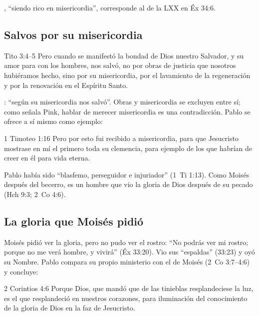 , ``siendo rico en misericordia'', corresponde al  de la LXX en Éx 34:6.


\subsection{Salvos por su misericordia}
\begin{verso}{Tito 3:4–5}
Pero cuando se manifestó la bondad de Dios nuestro Salvador, y su amor para con los hombres, nos salvó, no por obras de justicia que nosotros hubiéramos hecho, sino por su misericordia, por el lavamiento de la regeneración y por la renovación en el Espíritu Santo.
\end{verso}

: ``según su misericordia nos salvó''. Obras y misericordia se excluyen entre sí; como señala Pink, hablar de merecer misericordia es una contradicción. Pablo se ofrece a sí mismo como ejemplo:

\begin{verso}{1 Timoteo 1:16}
Pero por esto fui recibido a misericordia, para que Jesucristo mostrase en mí el primero toda su clemencia, para ejemplo de los que habrían de creer en él para vida eterna.
\end{verso}

Pablo había sido ``blasfemo, perseguidor e injuriador'' (1~Ti 1:13). Como Moisés después del becerro, es un hombre que vio la gloria de Dios después de su pecado (Hch 9:3; 2~Co 4:6).


\subsection{La gloria que Moisés pidió}
Moisés pidió ver la gloria, pero no pudo ver el rostro: ``No podrás ver mi rostro; porque no me verá hombre, y vivirá'' (Éx 33:20). Vio sus ``espaldas'' (33:23) y oyó su Nombre. Pablo compara su propio ministerio con el de Moisés (2~Co 3:7--4:6) y concluye:

\begin{verso}{2 Corintios 4:6}
Porque Dios, que mandó que de las tinieblas resplandeciese la luz, es el que resplandeció en nuestros corazones, para iluminación del conocimiento de la gloria de Dios en la faz de Jesucristo.
\end{verso}

